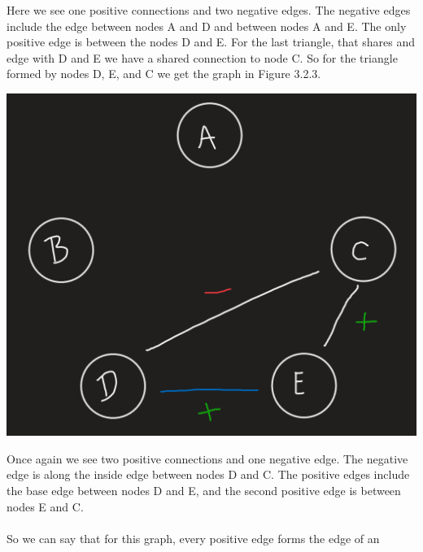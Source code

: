 \documentclass[11pt]{article}
\begin{document}
\begin{enumerate}
{\begin{center}
\end{center}
Here we see one positive connections and two negative edges. The negative edges include the edge between nodes A and D and between nodes A and E.  The only positive edge is between the nodes D and E. For the last triangle, that shares and edge with D and E we have a shared connection to node C.  So for the triangle formed by nodes D, E, and C we get the graph in Figure 3.2.3.
\begin{center}
	\includegraphics[scale=0.5]{Figure_3_2_3}\\
\end{center}
Once again we see two positive connections and one negative edge. The negative edge is along the inside edge between nodes D and C.  The positive edges include the base edge between nodes D and E, and the second positive edge is between nodes E and C.\\\\
So we can say that for this graph, every positive edge forms the edge of an 
}


\end{enumerate}
\end{document}
